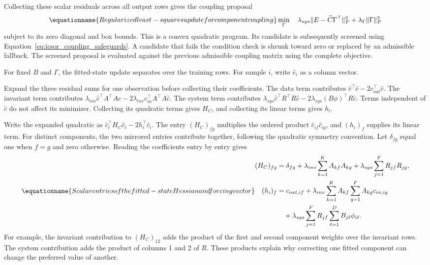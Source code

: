Collecting these scalar residuals across all output rows gives the coupling proposal
\begin{equation}
\equationname{Regularized least-squares update for component coupling}
\label{eq:icsor_coupling_update}
\min_{\Gamma}\quad
\lambda_{sys}\|E-\widehat C\Gamma^\top\|_F^2+
\lambda_{\Gamma}\|\Gamma\|_F^2
\end{equation}
subject to its zero diagonal and box bounds. This is a convex quadratic program. Its candidate is subsequently screened using Equation~\eqref{eq:icsor_coupling_safeguards}. A candidate that fails the condition check is shrunk toward zero or replaced by an admissible fallback. The screened proposal is evaluated against the previous admissible coupling matrix using the complete objective.

For fixed \(B\) and \(\Gamma\), the fitted-state update separates over the training rows. For sample \(i\), write \(\widehat c_i\) as a column vector.

Expand the three residual sums for one observation before collecting their coefficients. The data term contributes \(\widehat c^\top\widehat c-2c_{out}^\top\widehat c\). The invariant term contributes \(\lambda_{inv}\widehat c^\top A^\top A\widehat c-2\lambda_{inv}c_{in}^\top A^\top A\widehat c\). The system term contributes \(\lambda_{sys}\widehat c^\top R^\top R\widehat c-2\lambda_{sys}(B\phi)^\top R\widehat c\). Terms independent of \(\widehat c\) do not affect its minimizer. Collecting its quadratic terms gives \(H_C\), and collecting its linear terms gives \(h_i\).

Write the expanded quadratic as \(\widehat c_i^\top H_C\widehat c_i-2h_i^\top\widehat c_i\). The entry \((H_C)_{fg}\) multiplies the ordered product \(\widehat c_{if}\widehat c_{ig}\), and \((h_i)_f\) supplies its linear term. For distinct components, the two mirrored entries contribute together, following the quadratic symmetry convention. Let \(\delta_{fg}\) equal one when \(f=g\) and zero otherwise. Reading the coefficients entry by entry gives
\begin{equation}
\equationname{Scalar entries of the fitted-state Hessian and forcing vector}
\label{eq:icsor_state_scalar_coefficients}
\begin{aligned}
(H_C)_{fg}&=\delta_{fg}+\lambda_{inv}\sum_{k=1}^{K}A_{kf}A_{kg}
+\lambda_{sys}\sum_{j=1}^{F}R_{jf}R_{jg},\\
(h_i)_f&=c_{out,if}
+\lambda_{inv}\sum_{k=1}^{K}A_{kf}\sum_{g=1}^{F}A_{kg}c_{in,ig}\\
&\quad+\lambda_{sys}\sum_{j=1}^{F}R_{jf}\sum_{\ell=1}^{D}B_{j\ell}\phi_{i\ell}.
\end{aligned}
\end{equation}
For example, the invariant contribution to \((H_C)_{12}\) adds the product of the first and second component weights over the invariant rows. The system contribution adds the product of columns 1 and 2 of \(R\). These products explain why correcting one fitted component can change the preferred value of another.

